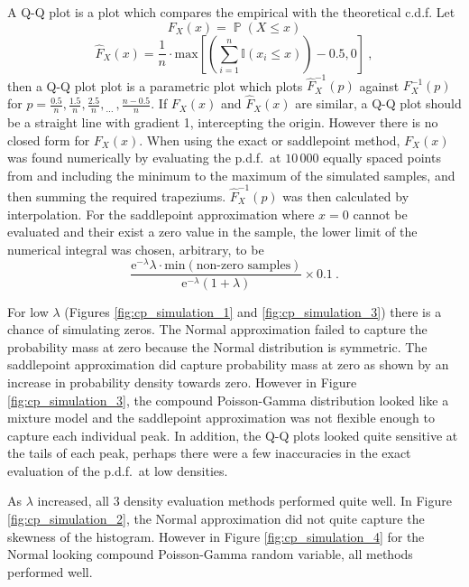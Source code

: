 \documentclass[12pt, a4paper]{memoir}
\DeclareMathOperator{\prob}{\mathbb{P}}
\newcommand{\euler}{\mathrm{e}}
\newcommand{\dotdotdot}{_{\phantom{.}\cdots}}
\begin{document}
A Q-Q plot is a plot which compares the empirical with the theoretical c.d.f. Let
\begin{equation}
F_X(x) = \prob(X\leqslant x)
\end{equation}
\begin{equation}
\widehat{F}_X(x) = \frac{1}{n}\cdot\text{max}\left[
\left(\sum_{i=1}^n\mathbb{I}(x_i\leqslant x)\right)-0.5,0
\right] \ ,
\end{equation}
then a Q-Q plot plot is a parametric plot which plots $\widehat{F}_X^{-1}(p)$ against $F_X^{-1}(p)$ for $p=\frac{0.5}{n},\frac{1.5}{n},\frac{2.5}{n},\dotdotdot,\frac{n-0.5}{n}$. If $F_X(x)$ and $\widehat{F}_X(x)$ are similar, a Q-Q plot should be a straight line with gradient 1, intercepting the origin. However there is no closed form for $F_X(x)$. When using the exact or saddlepoint method, $F_X(x)$ was found numerically by evaluating the p.d.f.~at $10\,000$ equally spaced points from and including the minimum to the maximum of the simulated samples, and then summing the required trapeziums. $\widehat{F}_X^{-1}(p)$ was then calculated by interpolation. For the saddlepoint approximation where $x=0$ cannot be evaluated and their exist a zero value in the sample, the lower limit of the numerical integral was chosen, arbitrary, to be
\begin{equation}
\frac{\euler^{-\lambda}\lambda\cdot\text{min}\left(\text{non-zero samples}\right)}{\euler^{-\lambda}(1+\lambda)}\times 0.1 \ .
\end{equation}

For low $\lambda$ (Figures \ref{fig:cp_simulation_1} and \ref{fig:cp_simulation_3}) there is a chance of simulating zeros. The Normal approximation failed to capture the probability mass at zero because the Normal distribution is symmetric. The saddlepoint approximation did capture probability mass at zero as shown by an increase in probability density towards zero. However in Figure \ref{fig:cp_simulation_3}, the compound Poisson-Gamma distribution looked like a mixture model and the saddlepoint approximation was not flexible enough to capture each individual peak. In addition, the Q-Q plots looked quite sensitive at the tails of each peak, perhaps there were a few inaccuracies in the exact evaluation of the p.d.f.~at low densities.

As $\lambda$ increased, all 3 density evaluation methods performed quite well. In Figure \ref{fig:cp_simulation_2}, the Normal approximation did not quite capture the skewness of the histogram. However in Figure \ref{fig:cp_simulation_4} for the Normal looking compound Poisson-Gamma random variable, all methods performed well.
\end{document}
